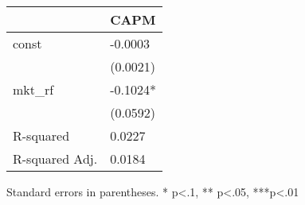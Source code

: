 \begin{table}
\caption{}
\label{}
\begin{center}
\begin{tabular}{ll}
\hline
               & CAPM      \\
\hline
const          & -0.0003   \\
               & (0.0021)  \\
mkt\_rf        & -0.1024*  \\
               & (0.0592)  \\
R-squared      & 0.0227    \\
R-squared Adj. & 0.0184    \\
\hline
\end{tabular}
\end{center}
\end{table}
\bigskip
Standard errors in parentheses. \newline 
* p<.1, ** p<.05, ***p<.01